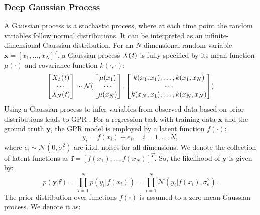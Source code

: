 \subsubsection{Deep Gaussian Process}
A Gaussian process is a stochastic process, where at each time point the random variables follow normal distributions. It can be interpreted as an infinite-dimensional Gaussian distribution. For an $N$-dimensional random variable $\boldsymbol{x}=[x_1,\dots,x_N]^T$, a Gaussian process $\it{X}(t)$ is fully specified by its mean function $\mu(\cdot)$ and covariance function $k(\cdot, \cdot)$:
\begin{equation}
     \begin{bmatrix} \it{X}_1(t) \\ \cdots \\\it{X}_N(t) \end{bmatrix}\sim\mathcal{N}( \begin{bmatrix} \mu(x_1) \\ \cdots \\\mu(x_N) \end{bmatrix},  \begin{bmatrix} k(x_1,x_1),\dots,k(x_1, x_N) \\ \cdots \\k(x_N,x_1), \dots,k(x_N, x_N) \end{bmatrix})
\end{equation}
Using a Gaussian process to infer variables from observed data based on prior distributions leads to \ac{GPR} \citep{Rasmussen_Williams_2008}. For a regression task with training data $\boldsymbol{x}$ and the ground truth $\boldsymbol{y}$, the \ac{GPR} model is employed by a latent function $f(\cdot)$:
\begin{equation}
    \label{eq:simgp}
    y_i = f(x_i) + \epsilon_i,\quad i=1,\dots,N,
\end{equation}
where $\epsilon_i \sim \mathcal{N}(0, \sigma_\epsilon^2)$ are \ac{i.i.d.} noises for all dimensions. We denote the collection of latent functions as $\boldsymbol{f}=[f(x_1), \dots, f(x_N)]^T$. So, the likelihood of $\boldsymbol{y}$ is given by:
\begin{equation}
    p(\boldsymbol{y}|\boldsymbol{f}) = \prod_{i=1}^{N}p(y_i|f(x_i)) = \prod_{i=1}^{N}\mathcal{N}(y_i|f(x_i), \sigma_\epsilon^2).    
\end{equation}                                                                                                                          
The prior distribution over functions $f(\cdot)$ is assumed to a zero-mean Gaussian process. We denote it as:
